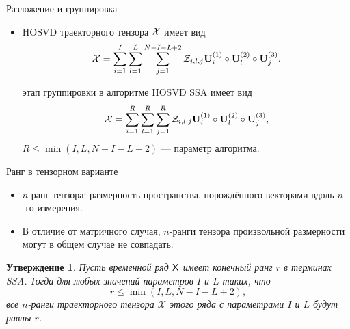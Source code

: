 \documentclass[ucs, notheorems, handout]{beamer}
\newcommand{\bluetext}[1]{{\usebeamercolor[fg]{bluetext_color}#1}}
\newtheorem{statement}{Утверждение}
\begin{document}
    \begin{frame}{Разложение и группировка}
        \begin{itemize}
            \item HOSVD траекторного тензора $\mathcal{X}$ имеет вид
            \[
                \mathcal{X} = \sum_{i=1}^{I} \sum_{l=1}^{L} \sum_{j=1}^{N-I-L+2} \mathcal{Z}_{i,l,j} \mathbf{U}^{(1)}_{i}
                \circ \mathbf{U}^{(2)}_{l} \circ \mathbf{U}^{(3)}_{j}.
            \]

            \vspace{0.6cm}
             этап группировки в алгоритме HOSVD SSA имеет вид
            \[
                \mathcal{X} = \sum_{i=1}^{R} \sum_{l=1}^{R} \sum_{j=1}^{R} \mathcal{Z}_{i,l,j} \mathbf{U}^{(1)}_{i}
                \circ \mathbf{U}^{(2)}_{l} \circ \mathbf{U}^{(3)}_{j},
            \]
            $R\leqslant \min(I, L, N - I - L + 2)$ --- параметр алгоритма.
        \end{itemize}
    \end{frame}
    
        \begin{frame}{Ранг в тензорном варианте}
        \begin{itemize}
            \item \bluetext{$n$-ранг тензора:} размерность пространства, порождённого
            векторами вдоль $n$-го измерения.

            \item В отличие от матричного случая, $n$-ранги тензора произвольной размерности могут в общем случае
            не совпадать.
        \end{itemize}

        \begin{statement}
            Пусть временной ряд $\mathsf{X}$ имеет конечный ранг $r$ в терминах \emph{SSA}\@.
            Тогда для любых значений параметров $I$ и $L$ таких, что
            \[
                r\leqslant\min(I, L, N-I-L+2),
            \]
            все $n$-ранги траекторного тензора $\mathcal{X}$
            этого ряда с параметрами $I$ и $L$ будут равны $r$.
        \end{statement}
    \end{frame}
\end{document}

